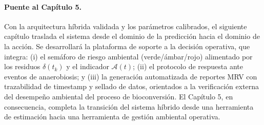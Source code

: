 \paragraph{Puente al Capítulo 5.}
Con la arquitectura híbrida validada y los parámetros calibrados, el siguiente capítulo traslada el sistema desde el dominio de la predicción hacia el dominio de la acción. Se desarrollará la plataforma de soporte a la decisión operativa, que integra: (i) el semáforo de riesgo ambiental (verde/ámbar/rojo) alimentado por los residuos $\delta(t_k)$ y el indicador $\mathcal{A}(t)$; (ii) el protocolo de respuesta ante eventos de anaerobiosis; y (iii) la generación automatizada de reportes MRV con trazabilidad de timestamp y sellado de datos, orientados a la verificación externa del desempeño ambiental del proceso de bioconversión. El Capítulo 5, en consecuencia, completa la transición del sistema híbrido desde una herramienta de estimación hacia una herramienta de gestión ambiental operativa.
